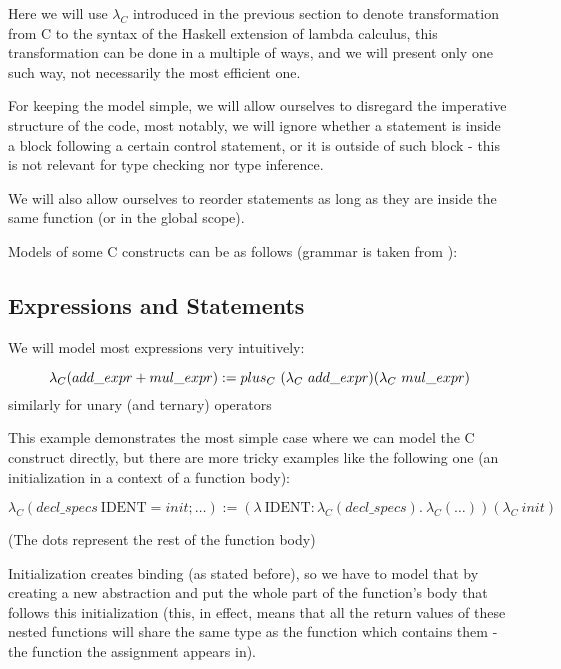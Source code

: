 Here we will use $\lambda_C$ introduced in the previous section to denote transformation from C to the syntax of the Haskell extension of lambda calculus, this transformation can be done in a multiple of ways, and we will present only one such way, not necessarily the most efficient one.

For keeping the model simple, we will allow ourselves to disregard the imperative structure of the code, most notably, we will ignore whether a statement is inside a block following a certain control statement, or it is outside of such block - this is not relevant for type checking nor type inference.

We will also allow ourselves to reorder statements as long as they are inside the same function (or in the global scope).

Models of some C constructs can be as follows (grammar is taken from \cite{organisation1999iso}):

\subsection{Expressions and Statements}
\label{ssec:exprStat}
We will model most expressions very intuitively:

\begin{defn}
    $$\lambda_C(add\_expr + mul\_expr) :=\\ plus_C\ (\lambda_C\ add\_expr) (\lambda_C\ mul\_expr)$$
    similarly for unary (and ternary) operators
\end{defn}


This example demonstrates the most simple case where we can model the C construct directly, but there are more tricky examples like the following one (an initialization in a context of a function body):

\begin{defn}
    $$\lambda_C(decl\_specs\ \text{IDENT} = init; \dots) := (\lambda\ \text{IDENT} : \lambda_C(decl\_specs) .\ \lambda_C(\dots)) (\lambda_C\ init)$$
\end{defn}

(The dots represent the rest of the function body)

Initialization creates binding (as stated before), so we have to model that by creating a new abstraction and put the whole part of the function's body that follows this initialization (this, in effect, means that all the return values of these nested functions will share the same type as the function which contains them - the function the assignment appears in).

